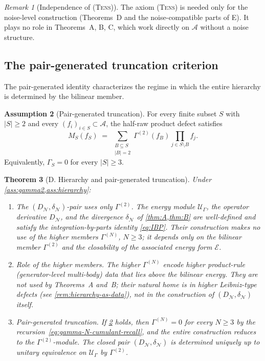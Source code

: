 \documentclass[11pt,reqno]{amsart}
\theoremstyle{plain}
\newtheorem{theorem}{Theorem}[section]
\theoremstyle{definition}
\newtheorem{assumption}[theorem]{Assumption}
\theoremstyle{remark}
\newtheorem{remark}[theorem]{Remark}
\newcommand{\cA}{\mathcal A}
\newcommand{\cE}{\mathcal E}
\newcommand{\cN}{\mathcal N}
\newcommand{\cU}{\mathcal U}
\newcommand{\dN}{D_{\cN}}
\newcommand{\divN}{\delta_{\cN}}
\begin{document}
\begin{remark}[Independence of \textsc{(Tens)}]\label{rem:tens-indep}
The axiom \textsc{(Tens)} is needed only for the noise-level
construction (Theorems~D and the noise-compatible parts of E).
It plays no role in Theorems~A, B, C, which work directly on
$\cA$ without a noise structure.
\end{remark}

\subsection{The pair-generated truncation criterion}\label{sec:pair-generated}

The pair-generated identity \cite[Eq.~(6.13)]{PrimitiveDivergence}
characterizes the regime in which the entire hierarchy is
determined by the bilinear member.

\begin{assumption}[Pair-generated truncation]\label{ass:pair-generated}
For every finite subset $S$ with $|S|\ge 2$ and every
$(f_{i})_{i\in S}\subset\cA$, the half-raw product defect
satisfies
\begin{equation}\label{eq:pair-generated-recall}
  M_{S}(f_{S})
  \;=\;
  \!\!\sum_{\substack{B\subseteq S\\|B|=2}}\!\!
  \Gamma^{(2)}(f_{B})\prod_{j\in S\setminus B}f_{j}.
\end{equation}
Equivalently, $\Gamma_{S}=0$ for every $|S|\ge 3$.
\end{assumption}

\begin{theorem}[D. Hierarchy and pair-generated truncation]\label{thm:D}
Under \cref{ass:gamma2,ass:hierarchy}:
\begin{enumerate}
\item[$(\mathrm i)$] \emph{The $(\dN,\divN)$-pair uses only
$\Gamma^{(2)}$.} The energy module $\cU_{\Gamma}$, the operator
derivative $\dN$, and the divergence $\divN$ of
\cref{thm:A,thm:B} are well-defined and satisfy the
integration-by-parts identity \eqref{eq:IBP}. Their construction
makes no use of the higher members $\Gamma^{(N)}$, $N\ge 3$; it
depends only on the bilinear member $\Gamma^{(2)}$ and the
closability of the associated energy form $\cE$.
\item[$(\mathrm{ii})$] \emph{Role of the higher members.} The
higher $\Gamma^{(N)}$ encode higher product-rule
(generator-level multi-body) data that lies above the bilinear
energy. They are not used by Theorems~A and~B; their natural
home is in higher Leibniz-type defects (see
\cref{rem:hierarchy-as-data}), not in the construction of
$(\dN,\divN)$ itself.
\item[$(\mathrm{iii})$] \emph{Pair-generated truncation.} If
\cref{ass:pair-generated} holds, then $\Gamma^{(N)}=0$ for every
$N\ge 3$ by the recursion~\eqref{eq:gamma-N-cumulant-recall},
and the entire construction reduces to the
$\Gamma^{(2)}$-module. The closed pair $(\dN,\divN)$ is
determined uniquely up to unitary equivalence on
$\cU_{\Gamma}$ by $\Gamma^{(2)}$.
\end{enumerate}
\end{theorem}
\end{document}
